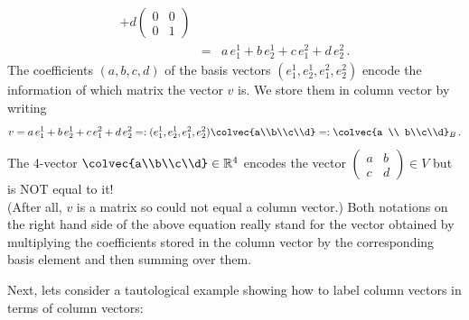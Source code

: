 \begin{example}
\begin{eqnarray*}
+d\begin{pmatrix}0&0\\0&1\end{pmatrix}\\[1mm]
&=&a\,  e^1_1+b \, e^1_2+c \, e^2_1+d \, e^2_2\, .
\end{eqnarray*}
The coefficients $(a,b,c,d)$ of the basis vectors $(e^1_1,e^1_2,e^2_1,e^2_2)$ encode the information of which matrix the vector $v$ is.
We store them in column vector by writing
\[
v=a \, e^1_1+b \, e^1_2+c\,  e^2_1+d \, e^2_2=: (e^1_1,e^1_2,e^2_1,e^2_2)\colvec{a\\b\\c\\d}=:\colvec{a \\ b\\c\\d}_B\, .
\]
The 4-vector $\colvec{a\\b\\c\\d} \in \mathbb{R}^4$ encodes the vector $\begin{pmatrix}a&b\\c&d\end{pmatrix}\in V$ but is NOT equal to it! \\(After all, $v$ is a matrix so could not equal a column vector.) Both notations on the right hand side of the above equation really stand for the vector obtained by multiplying the coefficients stored in the column vector by the corresponding basis element and then summing over them.
\end{example}
 
Next, lets consider a tautological example showing how to label column vectors in terms of column vectors:

